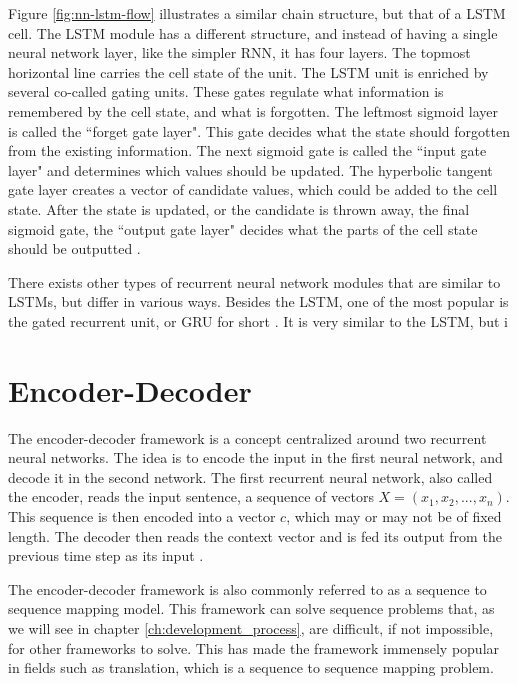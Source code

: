 Figure \ref{fig:nn-lstm-flow} illustrates a similar chain structure, but that of a LSTM cell. The LSTM module has a different structure, and instead of having a single neural network layer, like the simpler RNN, it has four layers. The topmost horizontal line carries the cell state of the unit. The LSTM unit is enriched by several co-called gating units. These gates regulate what information is remembered by the cell state, and what is forgotten. The leftmost sigmoid layer is called the ``forget gate layer". This gate decides what the state should forgotten from the existing information. The next sigmoid gate is called the ``input gate layer" and determines which values should be updated. The hyperbolic tangent gate layer creates a vector of candidate values, which could be added to the cell state. After the state is updated, or the candidate is thrown away, the final sigmoid gate, the ``output gate layer" decides what the parts of the cell state should be outputted \citep{hochreiter1997long, goodfellow2016deeplearning, olah2015lstm, gers2002learning}.

There exists other types of recurrent neural network modules that are similar to LSTMs, but differ in various ways. Besides the LSTM, one of the most popular is the gated recurrent unit, or GRU for short \citep{chung2014empirical}. It is very similar to the LSTM, but i


\section{Encoder-Decoder}
\label{sec:encoder-decoder}
The encoder-decoder framework is a concept centralized around two recurrent neural networks. The idea is to encode the input in the first neural network, and decode it in the second network. The first recurrent neural network, also called the encoder, reads the input sentence, a sequence of vectors \(X = (x_{1}, x_{2}, ..., x_{n})\). This sequence is then encoded into a vector \(c\), which may or may not be of fixed length. The decoder then reads the context vector and is fed its output from the previous time step as its input \citep{sutskever2014sequence}.

The encoder-decoder framework is also commonly referred to as a sequence to sequence mapping model. This framework can solve sequence problems that, as we will see in chapter \ref{ch:development_process}, are difficult, if not impossible, for other frameworks to solve. This has made the framework immensely popular in fields such as translation, which is a sequence to sequence mapping problem.